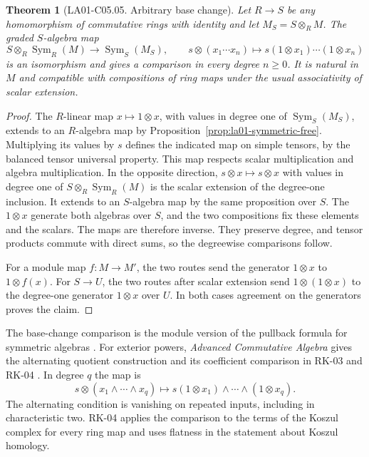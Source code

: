\documentclass[11pt,oneside,openany]{book}
\newtheorem{theorem}{Theorem}[chapter]
\theoremstyle{definition}
\theoremstyle{remark}
\begin{document}
\begin{theorem}[LA01-C05.05. Arbitrary base change]
\label{thm:la01-symmetric-base-change}
Let \(R\to S\) be any homomorphism of commutative rings with
identity and let \(M_S=S\otimes_R M\). The graded \(S\)-algebra map
\[
  S\otimes_R \operatorname{Sym}_R(M)
  \longrightarrow \operatorname{Sym}_S(M_S),
  \qquad
  s\otimes (x_1\cdots x_n)\longmapsto
       s(1\otimes x_1)\cdots(1\otimes x_n)
\]
is an isomorphism and gives a comparison in every degree \(n\ge 0\).
It is natural in \(M\) and compatible with compositions of
ring maps under the usual associativity of scalar extension.
\end{theorem}
\begin{proof}
The \(R\)-linear map \(x\mapsto 1\otimes x\), with values in
degree one of \(\operatorname{Sym}_S(M_S)\), extends to an
\(R\)-algebra map by Proposition~\ref{prop:la01-symmetric-free}.
Multiplying its values by \(s\) defines the indicated map on
simple tensors, by the balanced tensor universal property. This
map respects scalar multiplication and algebra multiplication.
In the opposite direction, \(s\otimes x\mapsto s\otimes x\) with
values in degree one of \(S\otimes_R\operatorname{Sym}_R(M)\)
is the scalar extension of the degree-one inclusion. It extends
to an \(S\)-algebra map by the same proposition over \(S\).
The \(1\otimes x\) generate both algebras over \(S\), and the
two compositions fix these elements and the scalars. The maps
are therefore inverse. They preserve degree, and tensor products
commute with direct sums, so the degreewise comparisons follow.

For a module map \(f\colon M\to M'\), the two routes send the
generator \(1\otimes x\) to \(1\otimes f(x)\). For \(S\to U\),
the two routes after scalar extension send \(1\otimes(1\otimes
x)\) to the degree-one generator \(1\otimes x\) over \(U\).
In both cases agreement on the generators proves the claim.
\end{proof}

The base-change comparison is the module version of the pullback
formula for symmetric algebras
\cite[Modules, Lemma 17.21.3]{stacks-sym}. For exterior powers,
\emph{Advanced Commutative Algebra} gives the alternating quotient
construction and its coefficient comparison in RK-03 and RK-04
\cite[RK-03 and RK-04]{commalg}. In degree \(q\) the map is
\[
  s\otimes(x_1\wedge\cdots\wedge x_q)
  \longmapsto s(1\otimes x_1)\wedge\cdots\wedge(1\otimes x_q).
\]
The alternating condition is vanishing on repeated inputs,
including in characteristic two. RK-04 applies the comparison to
the terms of the Koszul complex for every ring map and uses
flatness in the statement about Koszul homology.
\end{document}
